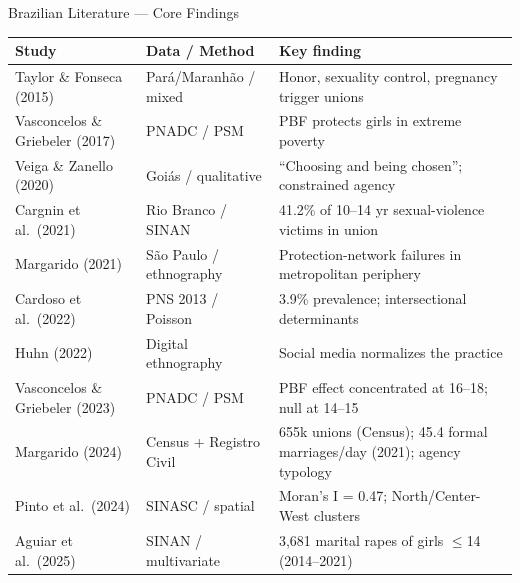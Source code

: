 \documentclass[aspectratio=169,10pt]{beamer}
\begin{document}
\begin{frame}{Brazilian Literature --- Core Findings}
    \small
    \begin{tabular}{p{3.2cm} p{3cm} p{7cm}}
        \toprule
        \textbf{Study} & \textbf{Data / Method} & \textbf{Key finding} \\
        \midrule
        Taylor \& Fonseca (2015) & Par\'a/Maranh\~ao / mixed & Honor, sexuality control, pregnancy trigger unions \\
        Vasconcelos \& Griebeler (2017) & PNADC / PSM & PBF protects girls in extreme poverty \\
        Veiga \& Zanello (2020) & Goi\'as / qualitative & ``Choosing and being chosen''; constrained agency \\
        Cargnin et al.\ (2021) & Rio Branco / SINAN & 41.2\% of 10--14 yr sexual-violence victims in union \\
        Margarido (2021) & S\~ao Paulo / ethnography & Protection-network failures in metropolitan periphery \\
        Cardoso et al.\ (2022) & PNS 2013 / Poisson & 3.9\% prevalence; intersectional determinants \\
        Huhn (2022) & Digital ethnography & Social media normalizes the practice \\
        Vasconcelos \& Griebeler (2023) & PNADC / PSM & PBF effect concentrated at 16--18; null at 14--15 \\
        Margarido (2024) & Census + Registro Civil & 655k unions (Census); 45.4 formal marriages/day (2021); agency typology \\
        Pinto et al.\ (2024) & SINASC / spatial & Moran's I = 0.47; North/Center-West clusters \\
        Aguiar et al.\ (2025) & SINAN / multivariate & 3{,}681 marital rapes of girls $\leq$14 (2014--2021) \\
        \bottomrule
    \end{tabular}
\end{frame}
\end{document}
